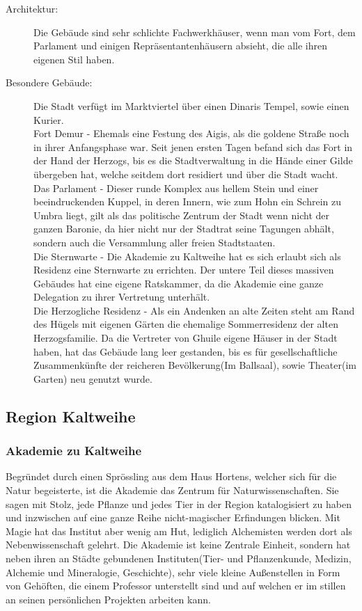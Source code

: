\documentclass[a4paper,12pt,oneside]{book}
\begin{document}
\begin{description}
\item[Architektur:]Die Gebäude sind sehr schlichte Fachwerkhäuser, wenn man vom Fort, dem Parlament und einigen Repräsentantenhäusern absieht, die alle ihren eigenen Stil haben.
\item[Besondere Gebäude:]Die Stadt verfügt im Marktviertel über einen Dinaris Tempel, sowie einen Kurier.  
\\Fort Demur - Ehemals eine Festung des Aigis, als die goldene Straße noch in ihrer Anfangsphase war. Seit jenen ersten Tagen befand sich das Fort in der Hand der Herzogs, bis es die Stadtverwaltung in die Hände einer Gilde übergeben hat, welche seitdem dort residiert und über die Stadt wacht.
\\Das Parlament - Dieser runde Komplex aus hellem Stein und einer beeindruckenden Kuppel, in deren Innern, wie zum Hohn ein Schrein zu Umbra liegt, gilt als das politische Zentrum der Stadt wenn nicht der ganzen Baronie, da hier nicht nur der Stadtrat seine Tagungen abhält, sondern auch die Versammlung aller freien Stadtstaaten.
\\Die Sternwarte - Die Akademie zu Kaltweihe hat es sich erlaubt sich als Residenz eine Sternwarte zu errichten. Der untere Teil dieses massiven Gebäudes hat eine eigene Ratskammer, da die Akademie eine ganze Delegation zu ihrer Vertretung unterhält.
\\Die Herzogliche Residenz - Als ein Andenken an alte Zeiten steht am Rand des Hügels mit eigenen Gärten die ehemalige Sommerresidenz der alten Herzogsfamilie. Da die Vertreter von Ghuile eigene Häuser in der Stadt haben, hat das Gebäude lang leer gestanden, bis es für gesellschaftliche Zusammenkünfte der reicheren Bevölkerung(Im Ballsaal), sowie Theater(im Garten) neu genutzt wurde.
\end{description}

\subsection{Region Kaltweihe}

\subsubsection{Akademie zu Kaltweihe}
Begründet durch einen Sprössling aus dem Haus Hortens, welcher sich für die Natur begeisterte, ist die Akademie das Zentrum für Naturwissenschaften. Sie sagen mit Stolz, jede Pflanze und jedes Tier in der Region katalogisiert zu haben und inzwischen auf eine ganze Reihe nicht-magischer Erfindungen blicken. Mit Magie hat das Institut aber wenig am Hut, lediglich Alchemisten werden dort als Nebenwissenschaft gelehrt. Die Akademie ist keine Zentrale Einheit, sondern hat neben ihren an Städte gebundenen Instituten(Tier- und Pflanzenkunde, Medizin, Alchemie und Mineralogie, Geschichte), sehr viele kleine Außenstellen in Form von Gehöften, die einem Professor unterstellt sind und auf welchen er im stillen an seinen persönlichen Projekten arbeiten kann.
\end{document}
